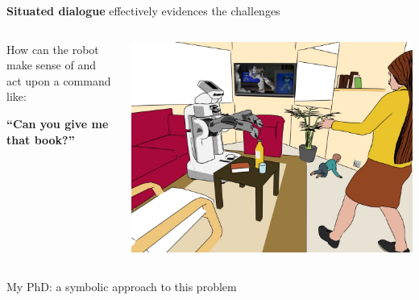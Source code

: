 \documentclass[compress]{beamer}
\begin{document}
\begin{frame}[plain]

    \centering
    {\bf Situated dialogue} effectively evidences the challenges

    \begin{columns}
        \begin{column}{0.5\linewidth}
            How can the robot make sense of and act upon a command like:
            \vspace{2em}

            \bf
            ``Can you give me that book?''
        \end{column}
        \begin{column}{0.5\linewidth}
            \begin{center}
                \includegraphics[width=\linewidth]{pr2-baby-3}
            \end{center}
        \end{column}
    \end{columns}

    \pause

    \vspace{2em}
    My PhD: a symbolic approach to this problem
\end{frame}


\end{document}

